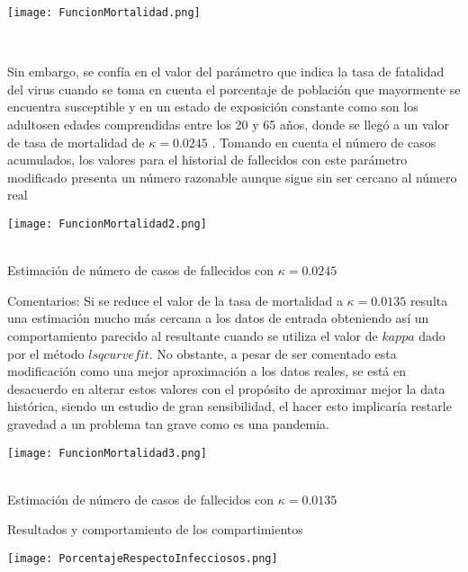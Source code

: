 \documentclass[11pt]{article}
\begin{document}
\begin{center}
    \texttt{[image: FuncionMortalidad.png]}
    \caption{\\}
\end{center} 

Sin embargo, se confía en el valor del parámetro que indica la tasa de fatalidad del virus cuando se toma en cuenta el porcentaje de población que mayormente se encuentra susceptible y en un estado de exposición constante como son los adultosen edades comprendidas entre los 20 y 65 años, donde se llegó a un valor de tasa de mortalidad de $\kappa = 0.0245$ . Tomando en cuenta el número de casos acumulados, los valores para el historial de fallecidos con este parámetro modificado presenta un número razonable aunque sigue sin ser cercano al número real

\begin{center}
    \texttt{[image: FuncionMortalidad2.png]}
    \caption{\\Estimación de número de casos de fallecidos con $\kappa = 0.0245$ }
\end{center} 

Comentarios: Si se reduce el valor de la tasa de mortalidad a $\kappa = 0.0135$ resulta una estimación mucho más cercana a los datos de entrada obteniendo así un comportamiento parecido al resultante cuando se utiliza el valor de $kappa$ dado por el método $lsqcurvefit$. No obstante, a pesar de ser comentado esta modificación como una mejor aproximación a los datos reales, se está en desacuerdo en alterar estos valores con el propósito de aproximar mejor la data histórica, siendo un estudio de gran sensibilidad, el hacer esto implicaría restarle gravedad a un problema tan grave como es una pandemia.

\begin{center}
    \texttt{[image: FuncionMortalidad3.png]}
    \caption{\\Estimación de número de casos de fallecidos con $\kappa = 0.0135$ }
\end{center} 

\begin{center} \Large {Resultados y comportamiento de los compartimientos} \end{center}



\begin{center}
    \texttt{[image: PorcentajeRespectoInfecciosos.png]}
    \caption{\\}
\end{center}  
\end{document}
